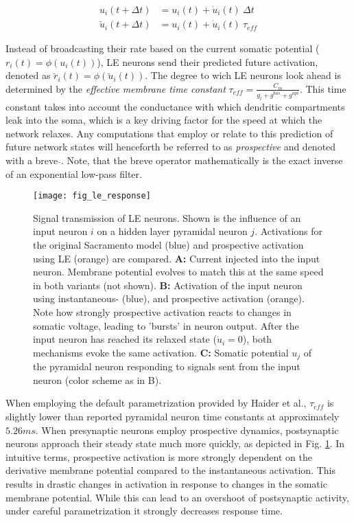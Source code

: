 \begin{align}
  u_i(t+ \Delta t)          & = u_i(t) + \dot{u}_i(t) \ \Delta t \label{eq-r-t-sacramento} \\
  \breve{u}_i(t + \Delta t) & = u_i(t) + \dot{u}_i(t) \ \tau_{eff} \label{eq-r-t-haider}
\end{align}

Instead of broadcasting their rate based on the current somatic potential ($r_i(t) = \phi(u_i(t))$), LE neurons send
their predicted future activation, denoted as $\breve{r}_i(t) = \phi(\breve{u}_i(t))$. The degree to wich LE neurons
look ahead is determined by the \textit{effective membrane time constant} $\tau_{eff} = \frac{C_m}{g_l + g^{bas} +
g^{api}}$. This time constant takes into account the conductance with which dendritic compartments leak into the soma,
which is a key driving factor for the speed at which the network relaxes. Any computations that employ or relate to this
prediction of future network states will henceforth be referred to as \textit{prospective} and denoted with a breve
$\breve{}$. Note, that the breve operator mathematically is the exact inverse of an exponential low-pass filter.


\begin{figure}[h!]
  \centering
  \texttt{[image: fig\_le\_response]}
  \caption[Signal transmission of LE neurons]{Signal transmission of LE neurons. Shown is the influence of an input
    neuron $i$ on a hidden layer pyramidal neuron $j$. Activations for the original Sacramento model (blue) and
    prospective activation using LE (orange) are compared. \textbf{A:} Current injected into the input neuron. Membrane
    potential evolves to match this at the same speed in both variants (not shown). \textbf{B:} Activation of the input
    neuron using instantaneous- (blue), and prospective activation (orange). Note how strongly prospective activation
    reacts to changes in somatic voltage, leading to 'bursts' in neuron output. After the input neuron has reached its
    relaxed state ($\dot{u}_i = 0$), both mechanisms evoke the same activation. \textbf{C:} Somatic potential $u_j$ of
    the pyramidal neuron responding to signals sent from the input neuron (color scheme as in B).}
  \label{fig-comparison-le}
\end{figure}

When employing the default parametrization provided by Haider et al., $\tau_{eff}$ is slightly
lower than reported pyramidal neuron time constants \citep{McCormick1985} at approximately $5.26ms$. When presynaptic
neurons employ prospective dynamics, postsynaptic neurons approach their steady state much more quickly, as depicted in
Fig. \ref{fig-comparison-le}. In intuitive terms, prospective activation is more strongly dependent on the derivative
membrane potential compared to the instantaneous activation. This results in drastic changes in activation in response
to changes in the somatic membrane potential. While this can lead to an overshoot of postsynaptic activity, under
careful parametrization it strongly decreases response time.


